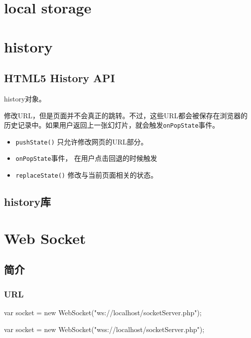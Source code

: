 \section{local storage}

\section{history}

\subsection{HTML5 History API}

history对象。

修改URL，但是页面并不会真正的跳转。不过，这些URL都会被保存在浏览器的历史记录中。如果用户返回上一张幻灯片，就会触发\lstinline$onPopState$事件。


\begin{itemize}

\item \lstinline$pushState()$ 只允许修改网页的URL部分。

\item \lstinline$onPopState$事件， 在用户点击回退的时候触发

\item \lstinline$replaceState()$ 修改与当前页面相关的状态。

\end{itemize}

\subsection{history库}



\section{Web Socket}

\subsection{简介}

\subsubsection{URL}

\begin{JavaScript}[ws和wss]


var socket = new WebSocket("ws://localhost/socketServer.php");

var socket = new WebSocket("wss://localhost/socketServer.php");

\end{JavaScript}


